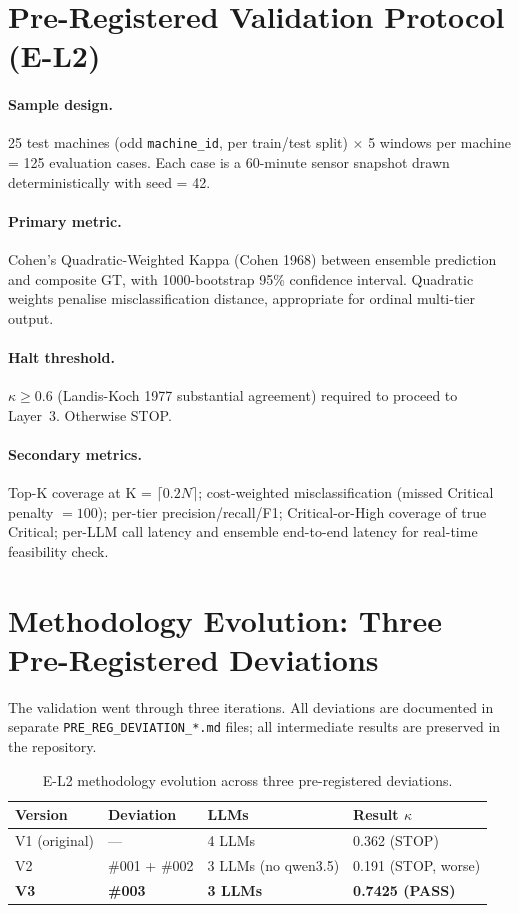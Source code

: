 \section{Pre-Registered Validation Protocol (E-L2)}

\paragraph{Sample design.} 25 test machines (odd \texttt{machine\_id}, per train/test split) $\times$ 5 windows per machine = 125 evaluation cases. Each case is a 60-minute sensor snapshot drawn deterministically with seed = 42.

\paragraph{Primary metric.} Cohen's Quadratic-Weighted Kappa (Cohen 1968) between ensemble prediction and composite GT, with 1000-bootstrap 95\% confidence interval. Quadratic weights penalise misclassification distance, appropriate for ordinal multi-tier output.

\paragraph{Halt threshold.} $\kappa \geq 0.6$ (Landis-Koch 1977 substantial agreement) required to proceed to Layer~3. Otherwise STOP.

\paragraph{Secondary metrics.} Top-K coverage at K = $\lceil 0.2 N \rceil$; cost-weighted misclassification (missed Critical penalty $= 100$); per-tier precision/recall/F1; Critical-or-High coverage of true Critical; per-LLM call latency and ensemble end-to-end latency for real-time feasibility check.

\section{Methodology Evolution: Three Pre-Registered Deviations}

The validation went through three iterations. All deviations are documented in separate \texttt{PRE\_REG\_DEVIATION\_*.md} files; all intermediate results are preserved in the repository.

\begin{table}[h!]
\centering
\caption{E-L2 methodology evolution across three pre-registered deviations.}
\label{tab:el2_evolution}
\begin{tabular}{llll}
\hline
\textbf{Version} & \textbf{Deviation} & \textbf{LLMs} & \textbf{Result $\kappa$} \\
\hline
V1 (original) & --- & 4 LLMs & 0.362 (STOP) \\
V2 & \#001 + \#002 & 3 LLMs (no qwen3.5) & 0.191 (STOP, worse) \\
\textbf{V3} & \textbf{\#003} & \textbf{3 LLMs} & \textbf{0.7425 (PASS)} \\
\hline
\end{tabular}
\end{table}

